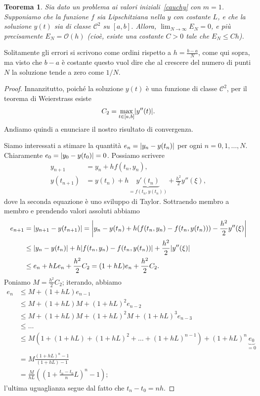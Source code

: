 \documentclass[a4paper]{report}
\DeclarePairedDelimiter{\abs}{\lvert}{\rvert}
\newtheorem{theorem}{Teorema}[chapter]
\theoremstyle{definiton}
\theoremstyle{remark}
\begin{document}
\begin{theorem}
Sia dato un problema ai valori iniziali~\eqref{cauchy} con $m=1$. Supponiamo che la funzione $f$ sia Lipschitziana nella $y$ con costante $L$, e che la soluzione $y(t)$ sia di classe $\mathcal{C}^2$ su $[a,b]$. Allora, $\lim_{N\to \infty} E_N = 0$, e più precisamente $E_N = \mathcal{O}(h)$ (cioè, esiste una costante $C>0$ tale che $E_N \leq Ch$).
\end{theorem}
Solitamente gli errori si scrivono come ordini rispetto a $h = \frac{b-a}{N}$, come qui sopra, ma visto che $b-a$ è costante questo vuol dire che al crescere del numero di punti $N$ la soluzione tende a zero come $1/N$.
\begin{proof}
Innanzitutto, poiché la soluzione $y(t)$ è una funzione di classe $\mathcal{C}^2$, per il teorema di Weierstrass esiste
\[
C_2 = \max_{t\in [a,b]} \abs{y''(t)}.
\]
Andiamo quindi a enunciare il nostro risultato di convergenza.
    
Siamo interessati a stimare la quantità $e_n = \abs{y_n - y(t_n)}$ per ogni $n=0,1,\dots,N$. Chiaramente $e_0 = \abs{y_0 - y(t_0)} = 0$. Possiamo scrivere
\begin{align*}
y_{n+1} &= y_n + h f(t_n, y_n),\\
y(t_{n+1}) &= y(t_n) + h \underbrace{y'(t_n)}_{=f(t_n,y(t_n))} + \frac{h^2}{2} y''(\xi),
\end{align*}
dove la seconda equazione è uno sviluppo di Taylor. Sottraendo membro a membro e prendendo valori assoluti abbiamo
\begin{align*}
    e_{n+1} &= \abs*{y_{n+1} - y(t_{n+1})} = \abs*{y_n - y(t_n) + h(f(t_n,y_n) - f(t_n,y(t_n))) - \frac{h^2}{2} y''(\xi)}\\
            & \leq \abs*{y_n - y(t_n)} + h \abs*{f(t_n,y_n) - f(t_n,y(t_n))} + \frac{h^2}{2} \abs*{y''(\xi)}\\
            & \leq e_n + hL e_n + \frac{h^2}{2}C_2 = (1+hL) e_n + \frac{h^2}{2}C_2.
\end{align*}
Poniamo $M = \frac{h^2}{2}C_2$; iterando, abbiamo
\begin{align*}
    e_n &\leq M + (1+hL)e_{n-1} \\&\leq M + (1+hL)M + (1+hL)^2e_{n-2}\\ &\leq M + (1+hL)M + (1+hL)^2M + (1+hL)^3 e_{n-3}\\
    & \leq \dots\\\
    & \leq M\left(1 + (1+hL) + (1+hL)^2 + \dots + (1+hL)^{n-1}\right)    + (1+hL)^n \underbrace{e_0}_{=0}\\
    & = M\frac{(1+hL)^n-1}{(1+hL)-1}\\
    & = \frac{M}{hL}\left(\left(1+\frac{t_n-t_0}{n}L\right)^n-1\right);
\end{align*}
l'ultima uguaglianza segue dal fatto che $t_n - t_0 = nh$. 


\end{proof}
\end{document}
